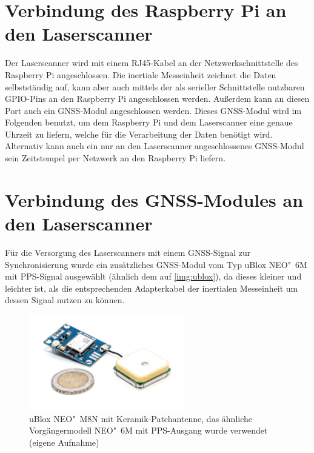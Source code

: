 \documentclass[a4paper,12pt,bibliography=totoc, listof=totoc,titlepage,pointlessnumbers]{scrreprt}
\begin{document}
\section{Verbindung des Rasp\-berry Pi an den Laser\-scan\-ner}
Der Laser\-scan\-ner wird mit einem RJ45-Kabel an der Netzwerkschnittstelle des Raspberry Pi angeschlossen. Die inertiale Messeinheit zeichnet die Daten selbst\-stän\-dig auf, kann aber auch mittels der als serieller Schnittstelle nutzbaren GPIO-Pins an den Rasp\-berry Pi angeschlossen werden. Außerdem kann an diesen Port auch ein GNSS-Modul angeschlossen werden. Dieses GNSS-Modul wird im Folgenden benutzt, um dem Rasp\-berry Pi und dem Laserscanner eine genaue Uhrzeit zu liefern, welche für die Verarbeitung der Daten benötigt wird. Alternativ kann auch ein nur an den Laser\-scan\-ner angeschlossenes GNSS-Modul sein Zeitstempel per Netzwerk an den Rasp\-berry Pi liefern.

\section{Verbindung des GNSS-Modules an den Laser\-scan\-ner}
\label{s:GNSSAnschluss}
Für die Versorgung des Laser\-scan\-ners mit einem GNSS-Signal zur Synchronisierung wurde ein zu\-sätz\-liches GNSS-Modul vom Typ uBlox NEO"~6M mit PPS-Signal ausgewählt (ähnlich dem auf \autoref{img:ublox}), da dieses kleiner und leichter ist, als die entsprechenden Adapterkabel der inertialen Messeinheit um dessen Signal nutzen zu können.

\begin{figure}
 \centering
 \includegraphics[width=0.6\textwidth]{./img/ublox.jpg}
 \caption{uBlox NEO"~M8N mit Keramik-Patchantenne, das ähnliche Vor\-gän\-ger\-mo\-dell NEO"~6M mit PPS-Ausgang wurde verwendet (eigene Aufnahme)}
 \label{img:ublox}
\end{figure}
\end{document}
